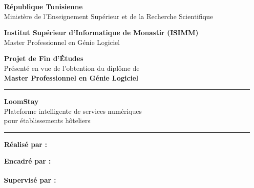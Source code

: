 
\begin{titlepage}
\begin{center}


\vspace{0.5cm}

{\large \textbf{République Tunisienne}}\\
{\large Ministère de l'Enseignement Supérieur et de la Recherche Scientifique}\\

\vspace{0.5cm}

{\Large \textbf{Institut Supérieur d'Informatique de Monastir (ISIMM)}}\\
{\large Master Professionnel en Génie Logiciel}\\

\vspace{1.5cm}

{\LARGE \textbf{Projet de Fin d'Études}}\\
{\large Présenté en vue de l'obtention du diplôme de}\\
{\Large \textbf{Master Professionnel en Génie Logiciel}}\\

\vspace{1.5cm}

\rule{\textwidth}{1pt}
\vspace{0.5cm}

{\Huge \textbf{LoomStay}}\\
\vspace{0.3cm}
{\Large Plateforme intelligente de services numériques\\pour établissements hôteliers}

\vspace{0.5cm}
\rule{\textwidth}{1pt}

\vspace{2cm}

\begin{minipage}[t]{0.45\textwidth}
  \begin{flushleft}
    \textbf{Réalisé par :}\\
  \end{flushleft}
\end{minipage}
\hfill
\begin{minipage}[t]{0.45\textwidth}
  \begin{flushright}
    \textbf{Encadré par :}\\
    \\
    \vspace{0.3cm}
    \textbf{Supervisé par :}\\
  \end{flushright}
\end{minipage}


\end{center}
\end{titlepage}
